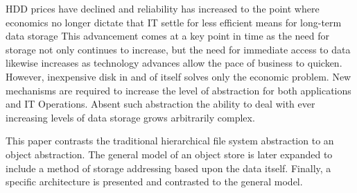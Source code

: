 HDD prices have declined and reliability
has increased to the point where economics no longer dictate that IT
settle for less efficient means for long-term data storage This
advancement comes at a key point in time as the need for storage not
only continues to increase, but the need for immediate access to data
likewise increases as technology advances allow the pace of business to
quicken. However, inexpensive disk in and of itself solves only the
economic problem. New mechanisms are required to increase the level of
abstraction for both applications and IT Operations. Absent such
abstraction the ability to deal with ever increasing levels of data
storage grows arbitrarily complex.

This paper contrasts the traditional
hierarchical file system abstraction to an object abstraction. The
general model of an object store is later expanded to include a method
of storage addressing based upon the data itself. Finally, a specific
architecture is presented and contrasted to the general
model.
